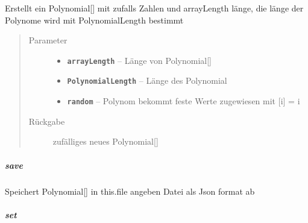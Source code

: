 \documentclass[letterpaper,10pt,ngerman]{sphinxmanual}
\begin{document}
\begin{fulllineitems}
\label{com/linuxluigi/polynomial/PolynomialList:com.linuxluigi.polynomial.PolynomialList.randomPolynomialArray(int, int, boolean)}
Erstellt ein Polynomial{[}{]} mit zufalls Zahlen und arrayLength länge, die länge der Polynome wird mit PolynomialLength bestimmt
\begin{quote}\begin{description}
\item[{Parameter}] \leavevmode\begin{itemize}
\item {} 
\textbf{\texttt{arrayLength}} -- Länge von Polynomial{[}{]}

\item {} 
\textbf{\texttt{PolynomialLength}} -- Länge des Polynomial

\item {} 
\textbf{\texttt{random}} -- Polynom bekommt feste Werte zugewiesen mit {[}i{]} = i

\end{itemize}

\item[{Rückgabe}] \leavevmode
zufälliges neues Polynomial{[}{]}

\end{description}\end{quote}

\end{fulllineitems}



\subparagraph{save}
\label{com/linuxluigi/polynomial/PolynomialList:save}

\begin{fulllineitems}
\label{com/linuxluigi/polynomial/PolynomialList:com.linuxluigi.polynomial.PolynomialList.save()}
Speichert Polynomial{[}{]} in this.file angeben Datei als Json format ab

\end{fulllineitems}



\subparagraph{set}
\label{com/linuxluigi/polynomial/PolynomialList:set}
\end{document}
